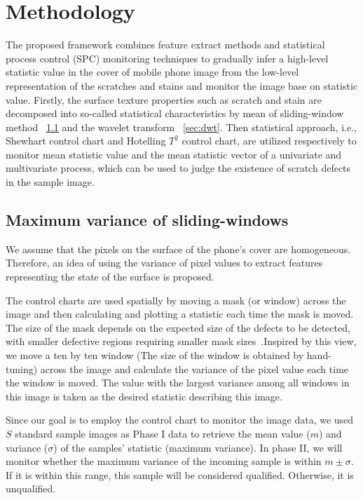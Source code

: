 \chapter{Methodology}
\label{cp:Methodology}

The proposed framework combines feature extract methods and statistical process control (SPC) monitoring techniques to
gradually infer a high-level statistic value in the cover of mobile phone image from the low-level representation of the scratches and stains and monitor the image base on statistic value. Firstly, the surface texture properties such as scratch and stain are decomposed into so-called statistical characteristics by mean of sliding-window method ~\ref{sec:maxvar} and the wavelet transform ~\ref{sec:dwt}. Then statistical approach, i.e., Shewhart control chart and Hotelling $T^{2}$ control chart, are utilized respectively to monitor mean statistic value and the mean statistic vector of a univariate and  multivariate process, which can be used to judge the existence of scratch defects in the sample image.

\section{Maximum variance of sliding-windows}
\label{sec:maxvar}
We assume that the pixels on the surface of the phone's cover are homogeneous. Therefore, an idea of using the variance of pixel values to extract features representing the state of the surface is proposed.



The control charts are used spatially by moving a mask (or window) across the image and then calculating and plotting a statistic each time the mask is moved. The size of the mask depends on the expected size of the defects to be detected, with smaller defective regions requiring smaller mask sizes~\cite{megahed2011review}.Inspired by this view, we move a ten by ten window (The size of the window is obtained by hand-tuning) across the image and calculate the variance of the pixel value each time the window is moved. The value with the largest variance among all windows in this image is taken as the desired statistic describing this image.

Since our goal is to employ the control chart to monitor the image data, we used $S$ standard sample images as Phase I data to retrieve the mean value ($m$) and variance ($ \sigma $) of the samples' statistic (maximum variance). In phase II, we will monitor whether the maximum variance of the incoming sample is within $m \pm \sigma$. If it is within this range, this sample will be considered qualified. Otherwise, it is unqualified.

